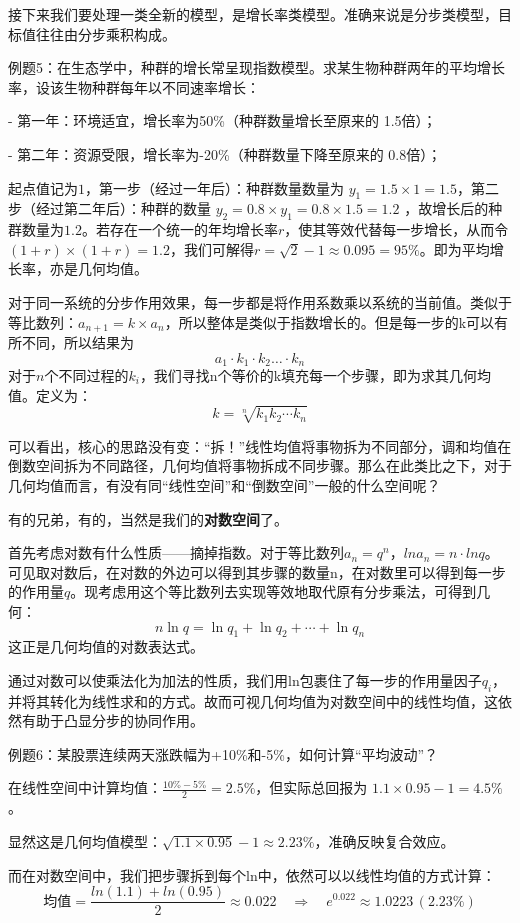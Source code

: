 \documentclass[fontset=none]{ctexart}
\begin{document}
接下来我们要处理一类全新的模型，是增长率类模型。准确来说是分步类模型，目标值往往由分步乘积构成。

\lishu
例题5：在生态学中，种群的增长常呈现指数模型。求某生物种群两年的平均增长率，设该生物种群每年以不同速率增长：

- 第一年：环境适宜，增长率为50\%（种群数量增长至原来的 1.5倍）；

- 第二年：资源受限，增长率为-20\%（种群数量下降至原来的 0.8倍）；

起点值记为$1$，第一步（经过一年后）：种群数量数量为 $y_1 = 1.5×1=1.5$，第二步（经过第二年后）：种群的数量 $y_2 = 0.8×y_1 = 0.8×1.5=1.2$ ，故增长后的种群数量为$1.2$。若存在一个统一的年均增长率$r$，使其等效代替每一步增长，从而令$(1+r)×(1+r)=1.2$，我们可解得$r = \sqrt{2}-1 \approx 0.095 = 95\%$。即为平均增长率，亦是几何均值。

\kaishu
对于同一系统的分步作用效果，每一步都是将作用系数乘以系统的当前值。类似于等比数列：$a_{n+1}=k×a_n$，所以整体是类似于指数增长的。但是每一步的k可以有所不同，所以结果为$$a_1\cdot k_1\cdot k_2\dots \cdot k_n$$
对于$n$个不同过程的$k_i$，我们寻找n个等价的k填充每一个步骤，即为求其几何均值。定义为：
$$k=\sqrt[n]{k_1k_2\cdots k_n}$$

可以看出，核心的思路没有变：“拆！”线性均值将事物拆为不同部分，调和均值在倒数空间拆为不同路径，几何均值将事物拆成不同步骤。那么在此类比之下，对于几何均值而言，有没有同“线性空间”和“倒数空间”一般的什么空间呢？

有的兄弟，有的，当然是我们的\textbf{对数空间}了。

首先考虑对数有什么性质——摘掉指数。对于等比数列$a_n = q^n$，$ln a_n = n\cdot ln q$。可见取对数后，在对数的外边可以得到其步骤的数量n，在对数里可以得到每一步的作用量$q$。现考虑用这个等比数列去实现等效地取代原有分步乘法，可得到几何：$$n\ln q=\ln q_1+\ln q_2+\cdots +\ln q_n$$这正是几何均值的对数表达式。

通过对数可以使乘法化为加法的性质，我们用ln包裹住了每一步的作用量因子$q_i$，并将其转化为线性求和的方式。故而可视几何均值为对数空间中的线性均值，这依然有助于凸显分步的协同作用。

\lishu
例题6：某股票连续两天涨跌幅为+10\%和-5\%，如何计算“平均波动”？

在线性空间中计算均值：\( \frac{10\% - 5\%}{2} = 2.5\% \)，但实际总回报为 \( 1.1 \times 0.95 -1 = 4.5\% \)。

显然这是几何均值模型：\( \sqrt{1.1 \times 0.95} -1 \approx 2.23\% \)，准确反映复合效应。

而在对数空间中，我们把步骤拆到每个ln中，依然可以以线性均值的方式计算： $$ \text{均值} = \frac{ln(1.1) + ln(0.95)}{2} \approx 0.022 \quad \Rightarrow \quad e^{0.022} \approx 1.0223 \, (2.23\%)$$
\end{document}
